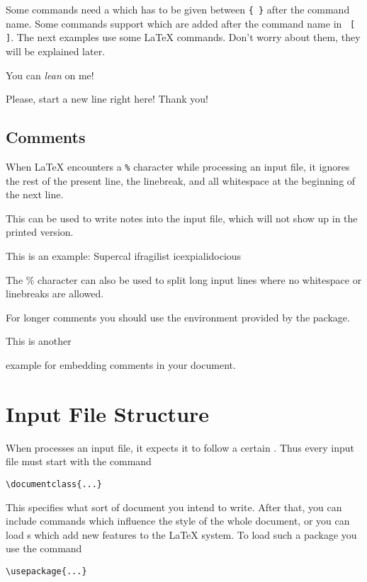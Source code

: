 Some commands need a  which has to be given between
 \verb|{ }| after the command name. Some commands support
 which are added after the command name in
~\verb|[ ]|. The next examples use some \LaTeX{}
commands. Don't worry about them, they will be explained later.

\begin{example}
You can \textsl{lean} on me!
\end{example}
\begin{example}
Please, start a new line
right here!\newline
Thank you!
\end{example}

\subsection{Comments}

When \LaTeX{} encounters a \verb|%| character while processing an input file,
it ignores the rest of the present line, the linebreak, and all
whitespace at the beginning of the next line.

This can be used to write notes into the input file, which will not show up
in the printed version.

\begin{example}
This is an %
example: Supercal%
              ifragilist%
    icexpialidocious
\end{example}

The \% character can also be used to split long input lines where no
whitespace or linebreaks are allowed.

For longer comments you should use the  environment
provided by the  package.
\begin{example}
This is another
\begin{comment}
rather stupid,
but helpful
\end{comment}
example for embedding comments in your document.
\end{example}

\section{Input File Structure}

When \LaTeXe{} processes an input file, it expects it to follow a
certain . Thus every input file must start with the
command
\begin{code}
\verb|\documentclass{...}|
\end{code}
This specifies what sort of document you intend to write. After that,
you can include commands which influence the style of the whole
document, or you can load s which add new
features to the \LaTeX{} system. To load such a package you use the
command
\begin{code}
\verb|\usepackage{...}|
\end{code}

